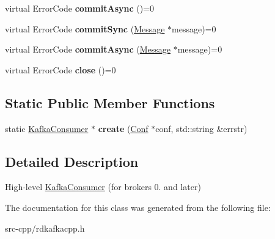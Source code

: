 \begin{DoxyCompactItemize}
\item 
\hypertarget{classRdKafka_1_1KafkaConsumer_a6d68b1b8d21dc26499938cb6e529f928}{virtual Error\-Code {\bfseries commit\-Async} ()=0}\label{classRdKafka_1_1KafkaConsumer_a6d68b1b8d21dc26499938cb6e529f928}

\item 
\hypertarget{classRdKafka_1_1KafkaConsumer_ac5d1b4fcadea749b774ab1cdd62de2d1}{virtual Error\-Code {\bfseries commit\-Sync} (\hyperlink{classRdKafka_1_1Message}{Message} $\ast$message)=0}\label{classRdKafka_1_1KafkaConsumer_ac5d1b4fcadea749b774ab1cdd62de2d1}

\item 
\hypertarget{classRdKafka_1_1KafkaConsumer_a278db6d20ebcaf501af9487c0957d57f}{virtual Error\-Code {\bfseries commit\-Async} (\hyperlink{classRdKafka_1_1Message}{Message} $\ast$message)=0}\label{classRdKafka_1_1KafkaConsumer_a278db6d20ebcaf501af9487c0957d57f}

\item 
\hypertarget{classRdKafka_1_1KafkaConsumer_a5c78a721aa91f3be9903f09ddf084644}{virtual Error\-Code {\bfseries close} ()=0}\label{classRdKafka_1_1KafkaConsumer_a5c78a721aa91f3be9903f09ddf084644}

\end{DoxyCompactItemize}
\subsection*{Static Public Member Functions}
\begin{DoxyCompactItemize}
\item 
\hypertarget{classRdKafka_1_1KafkaConsumer_ac32a5eb3474b3315635cb1d39794d068}{static \hyperlink{classRdKafka_1_1KafkaConsumer}{Kafka\-Consumer} $\ast$ {\bfseries create} (\hyperlink{classRdKafka_1_1Conf}{Conf} $\ast$conf, std\-::string \&errstr)}\label{classRdKafka_1_1KafkaConsumer_ac32a5eb3474b3315635cb1d39794d068}

\end{DoxyCompactItemize}


\subsection{Detailed Description}
High-\/level \hyperlink{classRdKafka_1_1KafkaConsumer}{Kafka\-Consumer} (for brokers 0. and later) 

The documentation for this class was generated from the following file\-:\begin{DoxyCompactItemize}
\item 
src-\/cpp/rdkafkacpp.\-h\end{DoxyCompactItemize}
